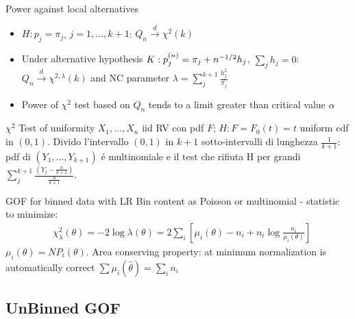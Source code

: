 \documentclass[asd-beamer.tex]{subfiles}
\begin{document}
\begin{frame}{Power against local alternatives}
	\begin{itemize}
		\item $H: p_j=\pi_j$, $j=1,\ldots,k+1$: $Q_n\xrightarrow{d}\chi^2(k)$
		\item Under alternative hypothesis $K: p_j^{(n)}=\pi_j+n^{-1/2}h_j$, $\sum_jh_j=0$: $Q_n\xrightarrow{d}\chi^{2,\lambda}(k)$ and NC parameter $\lambda=\sum_j^{k+1}\frac{h_j^2}{\pi_j}$
		\item Power of $\chi^2$ test based on $Q_n$ tends to a limit greater than critical value $\alpha$
	\end{itemize}
\end{frame}

\begin{frame}{$\chi^2$ Test of uniformity}
$X_1,\ldots,X_n$ iid RV con pdf $F$; $H: F=F_0(t)=t$ uniform cdf in $(0,1)$. Divido l'intervallo $(0,1)$ in $k+1$ sotto-intervalli di lunghezza $\frac{1}{k+1}$: pdf di $(Y_1,\ldots,Y_{k+1})$ \'e multinomiale e il test che rifiuta H per grandi $\sum_j^{k+1}\frac{(Y_j-\frac{n}{k+1})}{\frac{n}{k+1}}$.
\end{frame}



\begin{frame}{GOF for binned data with LR}
Bin content as Poisson or multinomial - statistic to minimize:
\begin{align*}
&\chi^2_{\lambda}(\theta)=-2\log{\lambda(\theta)}=2\sum_i[\mu_i(\theta)-n_i+n_i\log{\frac{n_i}{\mu_i(\theta)}}]
\end{align*}
$\mu_i(\theta)=NP_i(\theta)$. Area conserving property: at minimum normalization is automatically correct $\sum\mu_i(\hat{\theta})=\sum_in_i$
\end{frame}

\subsection{UnBinned GOF}\label{unbinnedgof}
\end{document}
